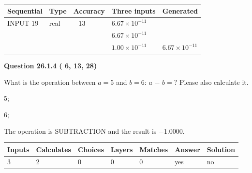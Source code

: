 \documentclass[12pt]{article}
\begin{document}
   
  
  
\noindent\begin{tabular}{|l|l|l|l|l|}
\hline
 Sequential & Type & Accuracy & Three inputs & Generated \\ 
\hline
 
 
  INPUT $          19$ & real & $         -13 $ & $
 6.67 \times 10^{-11}
  $ & \\
  & & &  $
 6.67 \times 10^{-11}
  $ & \\
  & & &  $
 1.00 \times 10^{-11}
 $ & $ 6.67 \times 10^{-11} $ 
 \\  \hline  
 \end{tabular}
   
   
  
\vspace{0.2in}
  
{\textbf{\Large{Question
26.1.4 
 (          6,         13,         28)
}}}
  
  
What is the operation between $a= %
5$ and $b= %
6$:
$a$  %
$-$ $b=?$ Please also calculate it.
 
 
\noindent{}
 
 

5;
 
6;
 
The operation is  %
SUBTRACTION and the result is
$ %
-1.0000$.
 
 
 
\noindent{}
 
 

 
\vspace{0.3in}
   
   
   
   
\noindent\begin{tabular}{|l|l|l|l|l|l|l|}
 \hline
Inputs & Calculates & Choices & Layers & Matches & Answer & Solution \\ \hline
           3 & 
           2 & 
           0
  & 
           0 & 
           0 & 
  yes & 
  no 
  \\ \hline
 \end{tabular}
   
   
   
   
\noindent{}
   
   
  
\end{document}
